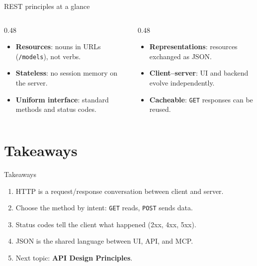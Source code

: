 \documentclass[aspectratio=169,10pt]{beamer}
\begin{document}
\begin{frame}{REST principles at a glance}
\begin{columns}[T]
\begin{column}{0.48\textwidth}
\begin{itemize}
\item \textbf{Resources}: nouns in URLs (\texttt{/models}), not verbs.
\item \textbf{Stateless}: no session memory on the server.
\item \textbf{Uniform interface}: standard methods and status codes.
\end{itemize}
\end{column}
\begin{column}{0.48\textwidth}
\begin{itemize}
\item \textbf{Representations}: resources exchanged as JSON.
\item \textbf{Client--server}: UI and backend evolve independently.
\item \textbf{Cacheable}: \texttt{GET} responses can be reused.
\end{itemize}
\end{column}
\end{columns}
\end{frame}

\section{Takeaways}

\begin{frame}{Takeaways}
\begin{enumerate}
\item HTTP is a request/response conversation between client and server.
\item Choose the method by intent: \texttt{GET} reads, \texttt{POST} sends data.
\item Status codes tell the client what happened (2xx, 4xx, 5xx).
\item JSON is the shared language between UI, API, and MCP.
\item Next topic: \textbf{API Design Principles}.
\end{enumerate}
\end{frame}
\end{document}

